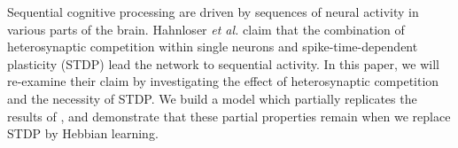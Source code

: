 Sequential cognitive processing are driven by sequences of neural activity in various parts of the brain. 
Hahnloser \textit{et al.} claim that the combination of heterosynaptic competition within single neurons and spike-time-dependent plasticity (STDP) lead the network to sequential activity. In this paper, we will re-examine their claim by investigating the effect of heterosynaptic competition and the necessity of STDP. We build a model which partially replicates the results of \cite{Fiete}, and demonstrate that these partial properties remain when we replace STDP by Hebbian learning.
